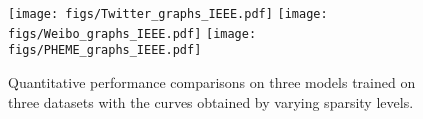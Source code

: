 





\begin{figure*}[!ht]
    \centering
    \texttt{[image: figs/Twitter\_graphs\_IEEE.pdf]}
    \texttt{[image: figs/Weibo\_graphs\_IEEE.pdf]}
    \texttt{[image: figs/PHEME\_graphs\_IEEE.pdf]}
    \caption{Quantitative performance comparisons on three models trained on three datasets with the curves obtained by varying sparsity levels.}
    \label{fig:graphs}
\end{figure*}

